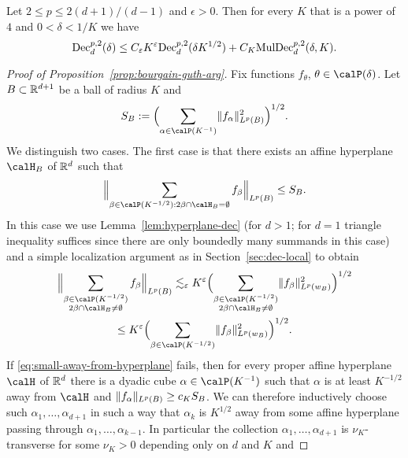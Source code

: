 \begin{proposition}
\label{prop:bourgain-guth-arg}
Let $2 \leq p \leq 2(d+1)/(d-1)$ and $\epsilon>0$.
Then for every $K$ that is a power of $4$ and $0<\delta<1/K$ we have
\begin{equation}
\label{eq:BG-arg}
\mathrm{Dec}_{d}^{p,2}(\delta)
\leq
C_{\varepsilon} K^{\varepsilon} \mathrm{Dec}_{d}^{p,2}(\delta K^{1/2})
+ C_{K} \mathrm{MulDec}_{d}^{p,2}(\delta, K).
\end{equation}
\end{proposition}
\begin{proof}[Proof of Proposition~\ref{prop:bourgain-guth-arg}]
Fix functions $f_{\theta}$, $\theta\in\Part{\delta}$.
Let $B \subset \mathbb{R}^{d+1}$ be a ball of radius $K$ and
\[
S_{B} := \Bigl( \sum_{\alpha\in\Part{K^{-1}}} \norm{f_{\alpha}}_{L^{p}(B)}^{2} \Bigr)^{1/2}.
\]
We distinguish two cases.
The first case is that there exists an affine hyperplane $\calH_{B}$ of $\mathbb{R}^{d}$ such that
\begin{equation}
\label{eq:small-away-from-hyperplane}
\norm[\Big]{ \sum_{\beta\in\Part{K^{-1/2}} : 2\beta \cap \calH_{B} = \emptyset} f_{\beta} }_{L^{p}(B)} \leq S_{B}.
\end{equation}
In this case we use Lemma~\ref{lem:hyperplane-dec} (for $d>1$; for $d=1$ triangle inequality suffices since there are only boundedly many summands in this case) and a simple localization argument as in Section~\ref{sec:dec-local} to obtain
\begin{multline*}
\norm[\Big]{ \sum_{\substack{\beta\in\Part{K^{-1/2}} \\ 2\beta \cap \calH_{B} \neq \emptyset}} f_{\beta} }_{L^{p}(B)}
\lesssim_{\epsilon}
K^{\epsilon} \Bigl( \sum_{\substack{\beta \in \Part{K^{-1/2}} \\ 2\beta \cap \calH_{B} \neq \emptyset}} \norm{ f_{\beta} }_{L^{p}(w_{B})}^{2} \Bigr)^{1/2}\\
\leq
K^{\epsilon} \Bigl( \sum_{\beta \in \Part{K^{-1/2}}} \norm{ f_{\beta} }_{L^{p}(w_{B})}^{2} \Bigr)^{1/2}.
\end{multline*}
If \eqref{eq:small-away-from-hyperplane} fails, then for every proper affine hyperplane $\calH$ of $\mathbb{R}^{d}$ there is a dyadic cube $\alpha \in \Part{K^{-1}}$ such that $\alpha$ is at least $K^{-1/2}$ away from $\calH$ and $\lVert f_{\alpha}\rVert_{L^{p}(B)} \geq c_{K} S_{B}$.
We can therefore inductively choose such $\alpha_{1},\dotsc,\alpha_{d+1}$ in such a way that $\alpha_{k}$ is $K^{1/2}$ away from some affine hyperplane passing through $\alpha_{1},\dotsc,\alpha_{k-1}$.
In particular the collection $\alpha_{1},\dotsc,\alpha_{d+1}$ is $\nu_{K}$-transverse for some $\nu_{K}>0$ depending only on $d$ and $K$ and

\end{proof}
